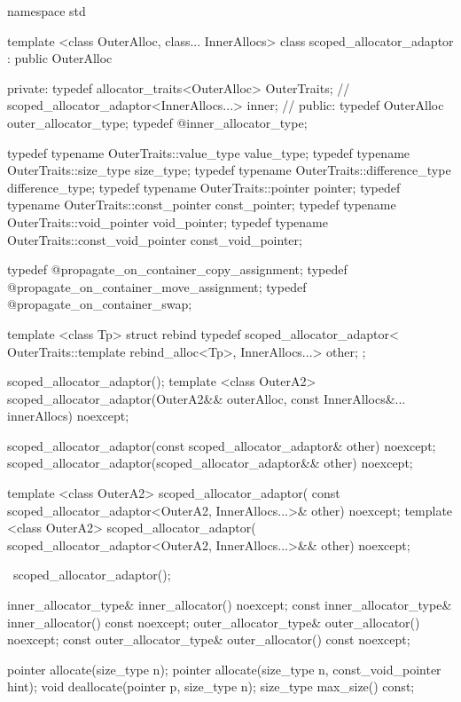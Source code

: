 \begin{codeblock}
namespace std {
  template <class OuterAlloc, class... InnerAllocs>
    class scoped_allocator_adaptor : public OuterAlloc {
  private:
    typedef allocator_traits<OuterAlloc> OuterTraits; // \expos
    scoped_allocator_adaptor<InnerAllocs...> inner;   // \expos
  public:
    typedef OuterAlloc outer_allocator_type;
    typedef @\seebelow@ inner_allocator_type;

    typedef typename OuterTraits::value_type value_type;
    typedef typename OuterTraits::size_type size_type;
    typedef typename OuterTraits::difference_type difference_type;
    typedef typename OuterTraits::pointer pointer;
    typedef typename OuterTraits::const_pointer const_pointer;
    typedef typename OuterTraits::void_pointer void_pointer;
    typedef typename OuterTraits::const_void_pointer const_void_pointer;

    typedef @\seebelow@ propagate_on_container_copy_assignment;
    typedef @\seebelow@ propagate_on_container_move_assignment;
    typedef @\seebelow@ propagate_on_container_swap;

    template <class Tp>
      struct rebind {
        typedef scoped_allocator_adaptor<
          OuterTraits::template rebind_alloc<Tp>, InnerAllocs...> other;
      };

    scoped_allocator_adaptor();
    template <class OuterA2>
      scoped_allocator_adaptor(OuterA2&& outerAlloc,
                               const InnerAllocs&... innerAllocs) noexcept;

    scoped_allocator_adaptor(const scoped_allocator_adaptor& other) noexcept;
    scoped_allocator_adaptor(scoped_allocator_adaptor&& other) noexcept;

    template <class OuterA2>
      scoped_allocator_adaptor(
        const scoped_allocator_adaptor<OuterA2, InnerAllocs...>& other) noexcept;
    template <class OuterA2>
      scoped_allocator_adaptor(
        scoped_allocator_adaptor<OuterA2, InnerAllocs...>&& other) noexcept;

    ~scoped_allocator_adaptor();

    inner_allocator_type& inner_allocator() noexcept;
    const inner_allocator_type& inner_allocator() const noexcept;
    outer_allocator_type& outer_allocator() noexcept;
    const outer_allocator_type& outer_allocator() const noexcept;

    pointer allocate(size_type n);
    pointer allocate(size_type n, const_void_pointer hint);
    void deallocate(pointer p, size_type n);
    size_type max_size() const;

}}
\end{codeblock}
